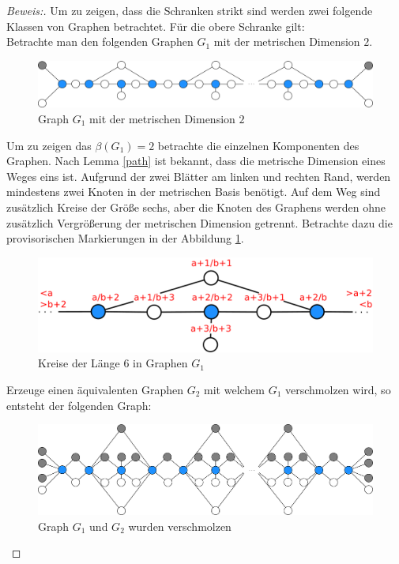 \begin{proof}[Beweis:] 
Um zu zeigen, dass die Schranken strikt sind werden zwei folgende Klassen von Graphen betrachtet. Für die obere Schranke gilt:\\
Betrachte man den folgenden Graphen $G_1$ mit der metrischen Dimension $2$.
\begin{figure}[h!]
		\centering 		 
\includegraphics[width=420pt]{bilder/ver.pdf}
   \caption{Graph $G_1$ mit der metrischen Dimension $2$}
  	 \end{figure}
Um zu zeigen das $\beta(G_1)=2$ betrachte die einzelnen Komponenten des Graphen. Nach Lemma \ref{path} ist bekannt, dass die metrische Dimension eines Weges eins ist. Aufgrund der zwei Blätter am linken und rechten Rand, werden mindestens zwei Knoten in der metrischen Basis benötigt. Auf dem Weg sind zusätzlich Kreise der Größe sechs, aber die Knoten des Graphens werden ohne zusätzlich Vergrößerung der metrischen Dimension getrennt. Betrachte dazu die provisorischen Markierungen in der Abbildung \ref{bild:Kreise}.
\begin{figure}[h!]
		\centering 		 
\includegraphics[width=420pt]{bilder/ver2.pdf}
   \caption{Kreise der Länge 6 in Graphen $G_1$}
   \label{bild:Kreise}
  	 \end{figure} 
  	 
Erzeuge einen äquivalenten Graphen $G_2$ mit welchem $G_1$ verschmolzen wird, so entsteht der folgenden Graph:

\begin{figure}[h!]
		\centering 		 
\includegraphics[width=420pt]{bilder/verschmolzenlandmarks.pdf}
   \caption{Graph $G_1$ und $G_2$ wurden verschmolzen}
  	 \end{figure}


\end{proof}
